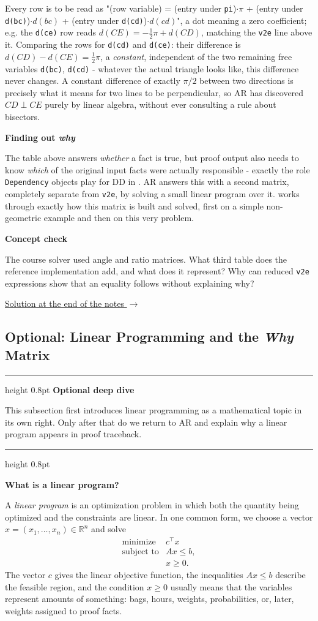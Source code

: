 \documentclass[reqno]{amsart}
\newenvironment{lecturebox}[1]{%
    \par\medskip
    \noindent\begingroup
    \setlength{\parindent}{0pt}
    \color{agblue}\hrule height 0.8pt\color{black}
    \smallskip
    \textbf{\color{agblue}#1}\par\smallskip
}{%
    \smallskip
    \color{agblue}\hrule height 0.8pt\color{black}
    \endgroup
    \medskip
}
\newcounter{conceptcheck}
\newenvironment{conceptcheck}[1]{%
    \refstepcounter{conceptcheck}%
    \def\conceptcheckid{#1}%
    \label{cc:#1}%
    \hypertarget{ccq:#1}{}%
    \par\medskip
    \noindent\begingroup
    \setlength{\fboxsep}{7pt}%
    \setlength{\fboxrule}{0.8pt}%
    \begin{lrbox}{\conceptcheckbox}%
    \begin{minipage}{\dimexpr\linewidth-2\fboxsep-2\fboxrule\relax}%
    \setlength{\parindent}{0pt}%
    \small
    \textbf{\color{conceptborder}Concept check \theconceptcheck}\par\smallskip
}{%
    \par\smallskip
    \hfill\hyperlink{cca:\conceptcheckid}{%
        \textcolor{conceptborder}{Solution at the end of the notes $\rightarrow$}}%
    \end{minipage}%
    \end{lrbox}%
    \fcolorbox{conceptborder}{conceptbg}{\usebox{\conceptcheckbox}}%
    \endgroup
    \medskip
}
\newcommand{\examplepart}[1]{%
    \par\medskip
    \noindent\textbf{\color{agblue}#1}\par\smallskip\noindent
}
\DeclareMathOperator{\1}{\textbf{1}}
\begin{document}
Every row is to be read as "(row variable) = (entry under \texttt{pi})$\cdot
\pi$ + (entry under \texttt{d(bc)})$\cdot d(bc)$ + (entry under
\texttt{d(cd)})$\cdot d(cd)$", a dot meaning a zero coefficient; e.g. the
\verb|d(ce)| row reads $d(CE) = -\frac12 \pi + d(CD)$, matching the
\verb|v2e| line above it. Comparing the rows for \verb|d(cd)| and
\verb|d(ce)|: their difference is $d(CD) - d(CE) = \frac12\pi$, a
\emph{constant}, independent of the two remaining free variables
\verb|d(bc)|, \verb|d(cd)| - whatever the actual triangle looks like, this
difference never changes. A constant difference of exactly $\pi/2$ between
two directions is precisely what it means for two lines to be perpendicular,
so AR has discovered $CD \perp CE$ purely by linear algebra, without ever
consulting a rule about bisectors.

\examplepart{Finding out \emph{why}}
The table above answers \emph{whether} a
fact is true, but proof output also needs to know \emph{which} of the
original input facts were actually responsible - exactly the role
\verb|Dependency| objects play for DD in . AR answers this
with a second matrix, completely separate from \verb|v2e|, by solving a
small linear program over it.  works through exactly how
this matrix is built and solved, first on a simple non-geometric example and
then on this very problem.

\begin{conceptcheck}{reference-ar}
The course solver used angle and ratio matrices. What third table does the
reference implementation add, and what does it represent? Why can reduced
\verb|v2e| expressions show that an equality follows without explaining why?
\end{conceptcheck}

\subsection{Optional: Linear Programming and the \emph{Why} Matrix}\label{sec: AR LP}

\begin{lecturebox}{Optional deep dive}
This subsection first introduces linear programming as a mathematical topic
in its own right. Only after that do we return to AR and explain why a linear
program appears in proof traceback.
\end{lecturebox}

\examplepart{What is a linear program?}
A \emph{linear program} is an optimization problem in which both the
quantity being optimized and the constraints are linear. In one common
form, we choose a vector \(x=(x_1,\ldots,x_n)\in \mathbb{R}^n\) and solve
\[
\begin{array}{ll}
\text{minimize}   & c^\top x \\[2mm]
\text{subject to} & Ax \leq b,\\
                  & x\geq 0.
\end{array}
\]
The vector \(c\) gives the linear objective function, the inequalities
\(Ax\leq b\) describe the feasible region, and the condition \(x\geq0\)
usually means that the variables represent amounts of something: bags,
hours, weights, probabilities, or, later, weights assigned to proof facts.
\end{document}
